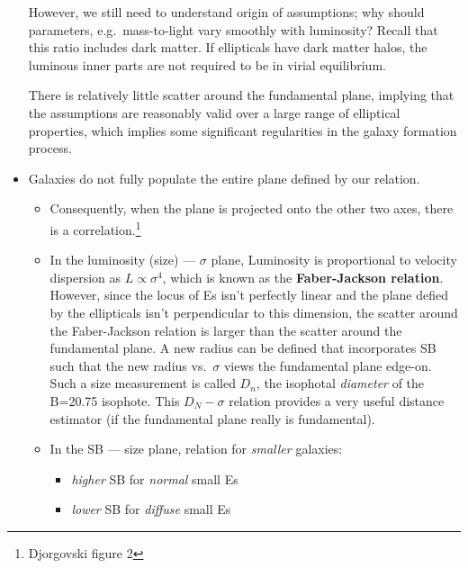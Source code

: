 \documentclass{article}
\begin{document}
\begin{itemize}
        However, we still need to understand origin of assumptions; why
        should parameters, e.g.\ mass-to-light vary smoothly with
        luminosity?  Recall that this ratio includes dark matter.  If
        ellipticals have dark matter halos, the luminous inner parts are
        not required to be in virial equilibrium.

        There is relatively little scatter around the fundamental plane,
        implying that the assumptions are reasonably valid over a large
        range of elliptical properties, which implies some significant
        regularities in the galaxy formation process.

    \item Galaxies do not fully populate the entire plane defined by our
        relation.
        \begin{itemize}
            \item Consequently, when the plane is projected onto the other
                two axes, there is a correlation.\footnote{
                    Djorgovski figure 2
                }
            \item In the luminosity (size) --- $\sigma$ plane,
                Luminosity is proportional to velocity dispersion as
                $L\propto\sigma^{4}$,
                which is known as the \textbf{Faber-Jackson relation}.
                However, since the locus of Es isn't perfectly linear and
                the plane defied by the ellipticals isn't perpendicular to
                this dimension, the scatter around the Faber-Jackson
                relation is larger than the scatter around the fundamental
                plane. A new radius can be defined that incorporates SB
                such that the new radius vs.\ $\sigma$ views the
                fundamental plane edge-on. Such a size measurement is
                called $D_{n}$, the isophotal \emph{diameter} of the
                B=20.75 isophote. This $D_{N}-\sigma$ relation provides a
                very useful distance estimator (if the fundamental plane
                really is fundamental).
            \item In the SB --- size plane, relation for \emph{smaller} galaxies:
                \begin{itemize}
                    \item \emph{higher} SB for \emph{normal} small Es
                    \item \emph{lower} SB for \emph{diffuse} small Es
                \end{itemize}

\end{itemize}
\end{itemize}
\end{document}
